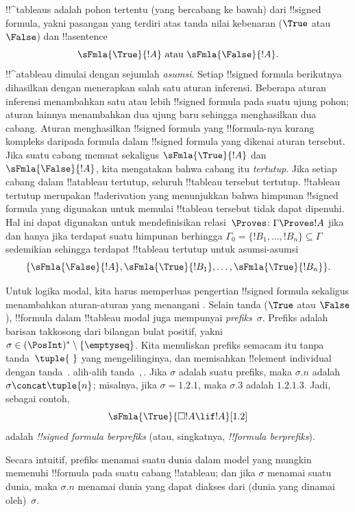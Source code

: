 \documentclass[../../../include/open-logic-section]{subfiles}
\begin{document}


!!^{tableau}s adalah pohon tertentu (yang bercabang ke bawah) dari
!!{signed formula}, yakni pasangan yang terdiri atas tanda nilai kebenaran
($\True$ atau $\False$) dan !!a{sentence}
\[
\sFmla{\True}{!A} \text{ atau } \sFmla{\False}{!A}.
\]
!!^a{tableau} dimulai dengan sejumlah \emph{asumsi}. Setiap
!!{signed formula} berikutnya dihasilkan dengan menerapkan salah satu aturan
inferensi. Beberapa aturan inferensi menambahkan satu atau lebih
!!{signed formula} pada suatu ujung pohon; aturan lainnya menambahkan dua
ujung baru sehingga menghasilkan dua cabang. Aturan menghasilkan
!!{signed formula} yang !!{formula}-nya kurang kompleks daripada formula
dalam !!{signed formula} yang dikenai aturan tersebut. Jika suatu cabang
memuat sekaligus $\sFmla{\True}{!A}$ dan $\sFmla{\False}{!A}$, kita mengatakan
bahwa cabang itu \emph{tertutup}. Jika setiap cabang dalam !!a{tableau}
tertutup, seluruh !!{tableau} tersebut tertutup. !!{tableau} tertutup
merupakan !!a{derivation} yang menunjukkan bahwa himpunan !!{signed formula}
yang digunakan untuk memulai !!{tableau} tersebut tidak dapat dipenuhi. Hal
ini dapat digunakan untuk mendefinisikan relasi~$\Proves$:
$\Gamma \Proves !A$ jika dan hanya jika terdapat suatu himpunan berhingga
$\Gamma_0 = \{!B_1, \dots, !B_n\} \subseteq \Gamma$ sedemikian sehingga
terdapat !!{tableau} tertutup untuk asumsi-asumsi
\[
\{\sFmla{\False}{!A}, \sFmla{\True}{!B_1}, \dots, \sFmla{\True}{!B_n}\}.
\]

Untuk logika modal, kita harus memperluas pengertian !!{signed formula}
sekaligus menambahkan aturan-aturan yang menangani
. Selain tanda ($\True$ atau $\False$),
!!{formula} dalam !!{tableau} modal juga mempunyai
\emph{prefiks}~$\sigma$. Prefiks adalah barisan takkosong dari bilangan bulat
positif, yakni $\sigma \in (\PosInt)^* \setminus \{\emptyseq\}$. Kita
menuliskan prefiks semacam itu tanpa tanda~$\tuple{\ }$ yang mengelilinginya,
dan memisahkan !!{element} individual dengan tanda~$.$ alih-alih tanda~$,$.
Jika $\sigma$ adalah suatu prefiks, maka $\sigma.n$ adalah
$\sigma \concat \tuple{n}$; misalnya, jika $\sigma = 1.2.1$, maka
$\sigma.3$ adalah $1.2.1.3$. Jadi, sebagai contoh,
\[
\sFmla{\True}{\Box !A \lif !A}[1.2]
\]
adalah \emph{!!{signed formula} berprefiks} (atau, singkatnya,
\emph{!!{formula} berprefiks}).

Secara intuitif, prefiks menamai suatu dunia dalam model yang mungkin
memenuhi !!{formula} pada suatu cabang !!a{tableau}; dan jika $\sigma$
menamai suatu dunia, maka $\sigma.n$ menamai dunia yang dapat diakses dari
(dunia yang dinamai oleh)~$\sigma$.
\end{document}
